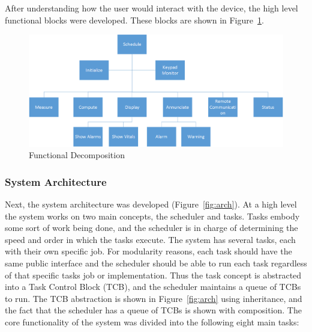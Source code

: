 \documentclass[12pt]{article} %
\begin{document}
    After understanding how the user would interact with the device, the high level
    functional blocks were developed. These blocks are shown in
    Figure~\ref{fig:func}. 


    \begin{figure}[h]
      \centering
      \includegraphics[width=\textwidth]{../design/Functional_decomposition}
      \caption{Functional Decomposition}
      \label{fig:func}
    \end{figure}

    \subsubsection{System Architecture}
    Next, the system architecture was developed (Figure~\ref{fig:arch}). At a high
    level the system works on two main concepts, the scheduler and tasks. Tasks
    embody some sort of work being done, and the scheduler is in charge of
    determining the speed and order in which the tasks execute. The system has
    several tasks, each with their own specific job. For modularity reasons, each
    task should have the same public interface and the scheduler should be able to
    run each task regardless of that specific tasks job or implementation. Thus
    the task concept is abstracted into a Task Control Block (TCB), and the
    scheduler maintains a queue of TCBs to run. The TCB abstraction is shown in
    Figure~\ref{fig:arch} using inheritance, and the fact that the scheduler has a
    queue of TCBs is shown with composition. The core functionality of the system
    was divided into the following eight main tasks:
\end{document}
